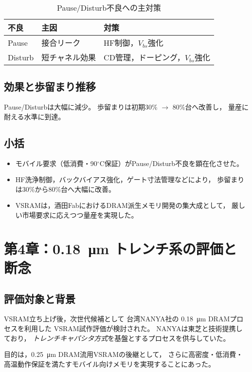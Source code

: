 \documentclass[conference]{IEEEtran}
\let\meter\metre
\begin{document}
\begin{table}[t]
\centering
\caption{Pause/Disturb不良への主対策}
\begin{tabular}{lll}
\toprule
不良 & 主因 & 対策 \\
\midrule
Pause & 接合リーク & HF制御，$V_{bs}$強化 \\
Disturb & 短チャネル効果 & CD管理，ドーピング，$V_{bs}$強化 \\
\bottomrule
\end{tabular}
\end{table}

\subsection{効果と歩留まり推移}
Pause/Disturbは大幅に減少。
歩留まりは初期30\% $\rightarrow$ 80\%台へ改善し，
量産に耐える水準に到達。

\subsection{小括}
\begin{itemize}
  \item モバイル要求（低消費・90$^\circ$C保証）がPause/Disturb不良を顕在化させた。
  \item HF洗浄制御，バックバイアス強化，ゲート寸法管理などにより，
        歩留まりは30\%から80\%台へ大幅に改善。
  \item VSRAMは，酒田FabにおけるDRAM派生メモリ開発の集大成として，
        厳しい市場要求に応えつつ量産を実現した。
\end{itemize}

\section{第4章：\texorpdfstring{\SI{0.18}{\micro\meter}}{0.18μm} トレンチ系の評価と断念}

\subsection{評価対象と背景}
VSRAM立ち上げ後，次世代候補として
台湾NANYA社の \SI{0.18}{\micro\meter} DRAMプロセスを利用した
VSRAM試作評価が検討された。
NANYAは東芝と技術提携しており，
\emph{トレンチキャパシタ方式}を基盤とするプロセスを供与していた。

目的は，\SI{0.25}{\micro\meter} DRAM流用VSRAMの後継として，
さらに高密度・低消費・高温動作保証を満たすモバイル向けメモリを実現することにあった。
\end{document}
